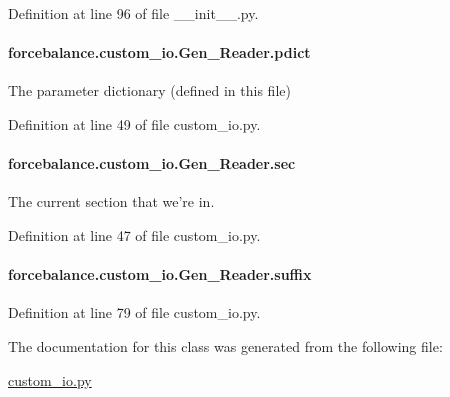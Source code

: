 Definition at line 96 of file \-\_\-\-\_\-init\-\_\-\-\_\-.\-py.

\hypertarget{classforcebalance_1_1custom__io_1_1Gen__Reader_a9beae2927c39b25cd569c4d2a3902c7d}{
\paragraph[{pdict}]{\setlength{\rightskip}{0pt plus 5cm}forcebalance.\-custom\-\_\-io.\-Gen\-\_\-\-Reader.\-pdict}}\label{classforcebalance_1_1custom__io_1_1Gen__Reader_a9beae2927c39b25cd569c4d2a3902c7d}


The parameter dictionary (defined in this file) 



Definition at line 49 of file custom\-\_\-io.\-py.

\hypertarget{classforcebalance_1_1custom__io_1_1Gen__Reader_ab6d68d48b38f27548edb3a4c3061f490}{
\paragraph[{sec}]{\setlength{\rightskip}{0pt plus 5cm}forcebalance.\-custom\-\_\-io.\-Gen\-\_\-\-Reader.\-sec}}\label{classforcebalance_1_1custom__io_1_1Gen__Reader_ab6d68d48b38f27548edb3a4c3061f490}


The current section that we're in. 



Definition at line 47 of file custom\-\_\-io.\-py.

\hypertarget{classforcebalance_1_1custom__io_1_1Gen__Reader_a2312641f63fba30851dc3ab5279f76cf}{
\paragraph[{suffix}]{\setlength{\rightskip}{0pt plus 5cm}forcebalance.\-custom\-\_\-io.\-Gen\-\_\-\-Reader.\-suffix}}\label{classforcebalance_1_1custom__io_1_1Gen__Reader_a2312641f63fba30851dc3ab5279f76cf}


Definition at line 79 of file custom\-\_\-io.\-py.



The documentation for this class was generated from the following file\-:\begin{DoxyCompactItemize}
\item 
\hyperlink{custom__io_8py}{custom\-\_\-io.\-py}\end{DoxyCompactItemize}

